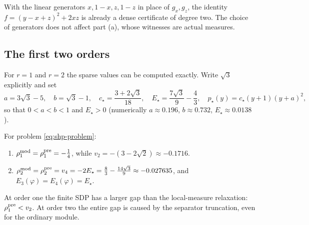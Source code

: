 With the linear generators $x,1-x,z,1-z$ in place of $g_x,g_z$, the
identity $f=(y-x+z)^2+2xz$ is already a dense certificate of degree two.
The choice of generators does not affect part (a), whose witnesses are
actual measures.

\subsection{The first two orders}\label{sec:shp-orders}

For $r=1$ and $r=2$ the sparse values can be computed exactly. Write
$\sqrt3$ explicitly and set
\begin{equation}\label{eq:shp-constants}
  a=3\sqrt3-5,\quad b=\sqrt3-1,\quad
  c_\star=\frac{3+2\sqrt3}{18},\quad
  E_\star=\frac{7\sqrt3}9-\frac43,\quad
  p_\star(y)=c_\star(y+1)(y+a)^2,
\end{equation}
so that $0<a<b<1$ and $E_\star>0$ (numerically $a\approx0.196$,
$b\approx0.732$, $E_\star\approx0.0138$).

\begin{proposition}
\label{prop:exact-orders}
For problem \eqref{eq:shp-problem}:
\begin{enumerate}[label=(\alph*)]
\item $\rho^{\mathrm{mod}}_1=\rho^{\mathrm{pre}}_1=-\frac14$, while
  $v_2=-(3-2\sqrt2)\approx-0.1716$.
\item $\rho^{\mathrm{mod}}_2=\rho^{\mathrm{pre}}_2=v_4=-2E_\star=\frac83-\frac{14\sqrt3}9\approx
  -0.027635$, and $E_3(\varphi)=E_4(\varphi)=E_\star$.
\end{enumerate}
\end{proposition}

At order one the finite SDP has a larger gap than the local-measure
relaxation: $\rho^{\mathrm{pre}}_1<v_2$. At order two the entire gap is caused by the
separator truncation, even for the ordinary module.

